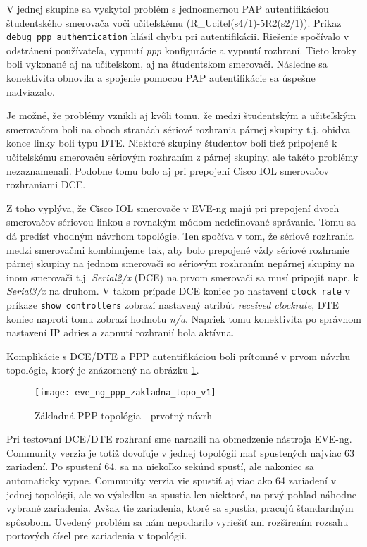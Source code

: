 V jednej skupine sa vyskytol problém s jednosmernou PAP autentifikáciou študentského smerovača voči učiteľskému (R\_Ucitel(s4/1)-5R2(s2/1)). Príkaz \texttt{debug ppp authentication} hlásil chybu pri autentifikácii. Riešenie spočívalo v odstránení používateľa, vypnutí \emph{ppp} konfigurácie a vypnutí rozhraní. Tieto kroky boli vykonané aj na učiteľskom, aj na študentskom smerovači. Následne sa konektivita obnovila a spojenie pomocou PAP autentifikácie sa úspešne nadviazalo.

Je možné, že problémy vznikli aj kvôli tomu, že medzi študentským a učiteľským smerovačom boli na oboch stranách sériové rozhrania párnej skupiny t.j. obidva konce linky boli typu DTE. Niektoré skupiny študentov boli tiež pripojené k učiteľskému smerovaču sériovým rozhraním z párnej skupiny, ale takéto problémy nezaznamenali. Podobne tomu bolo aj pri prepojení Cisco IOL smerovačov rozhraniami DCE.

Z toho vyplýva, že Cisco IOL smerovače v EVE-ng majú pri prepojení dvoch smerovačov sériovou linkou s rovnakým módom nedefinované správanie. Tomu sa dá predísť vhodným návrhom topológie. Ten spočíva v tom, že sériové rozhrania medzi smerovačmi kombinujeme tak, aby bolo prepojené vždy sériové rozhranie párnej skupiny na jednom smerovači so sériovým rozhraním nepárnej skupiny na inom smerovači t.j. \emph{Serial2/x} (DCE) na prvom smerovači sa musí pripojiť napr. k \emph{Serial3/x} na druhom. V takom prípade DCE koniec po nastavení \texttt{clock rate} v príkaze \texttt{show controllers} zobrazí nastavený atribút \emph{received clockrate}, DTE koniec naproti tomu zobrazí hodnotu \emph{n/a}. Napriek tomu konektivita po správnom nastavení IP adries a zapnutí rozhranií bola aktívna.

Komplikácie s DCE/DTE a PPP autentifikáciou boli prítomné v prvom návrhu topológie, ktorý je znázornený na obrázku \ref{obr:eve_ng_ppp_zakladna_topo_v1}.

\begin{figure}
    \centering
    \texttt{[image: eve\_ng\_ppp\_zakladna\_topo\_v1]}
    \caption{Základná PPP topológia - prvotný návrh}
    \label{obr:eve_ng_ppp_zakladna_topo_v1}
\end{figure}

Pri testovaní DCE/DTE rozhraní sme narazili na obmedzenie nástroja EVE-ng. Community verzia je totiž dovoľuje v jednej topológii mať spustených najviac 63 zariadení. Po spustení 64. sa na niekoľko sekúnd spustí, ale nakoniec sa automaticky vypne. Community verzia vie spustiť aj viac ako 64 zariadení v jednej topológii, ale vo výsledku sa spustia len niektoré, na prvý pohľad náhodne vybrané zariadenia. Avšak tie zariadenia, ktoré sa spustia, pracujú štandardným spôsobom. Uvedený problém sa nám nepodarilo vyriešiť ani rozšírením rozsahu portových čísel pre zariadenia v topológii.
  
